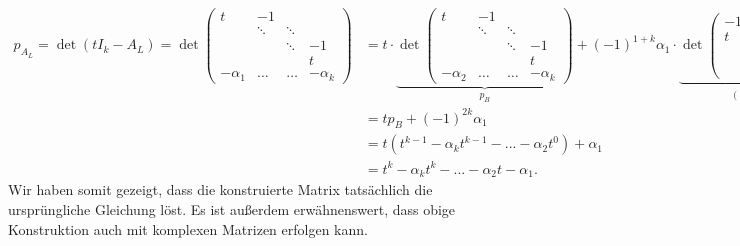 \documentclass{article}
\theoremstyle{plain} %
\theoremstyle{definition} %
\begin{document}
\begin{align*}
  p_{A_L} = \det(tI_k - A_L) = \det \begin{pmatrix}
    t         & -1     &        &           \\
              & \ddots & \ddots &           \\
              &        & \ddots & -1        \\
              &        &        & t         \\
    -\alpha_1 & \hdots & \hdots & -\alpha_k
  \end{pmatrix} & = t \cdot \underset{p_{B}}{\underbrace{\det \begin{pmatrix}
        t         & -1     &        &           \\
                  & \ddots & \ddots &           \\
                  &        & \ddots & -1        \\
                  &        &        & t         \\
        -\alpha_2 & \hdots & \hdots & -\alpha_k
      \end{pmatrix}}} + (-1)^{1+k} \alpha_1 \cdot \underset{(-1)^{k-1}}{\underbrace{\det \begin{pmatrix}
        -1 &        &        &    \\
        t  & \ddots &        &    \\
           & \ddots & \ddots &    \\
           &        & t      & -1 \\
      \end{pmatrix}}} \\
                                                               & = t p_{B} + (-1)^{2k} \alpha_1                                                                                                                                           \\
                                                               & = t(t^{k-1} - \alpha_k t^{k-1} - ... - \alpha_2 t^0) + \alpha_1                                                                                                          \\
                                                               & = t^k - \alpha_k t^k - ... - \alpha_2 t - \alpha_1.
\end{align*}
Wir haben somit gezeigt, dass die konstruierte Matrix tatsächlich die ursprüngliche Gleichung löst. Es ist außerdem erwähnenswert, dass obige Konstruktion auch mit komplexen Matrizen erfolgen kann.
\end{document}
